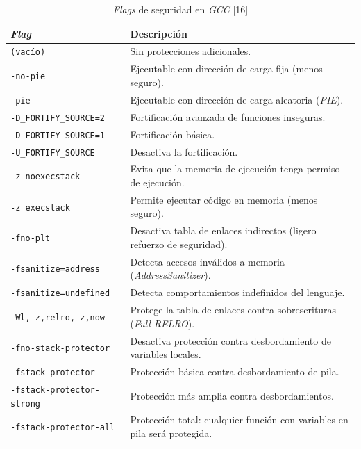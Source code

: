 \begin{table}[H]
\centering
\footnotesize %
\begin{tabularx}{\linewidth}{|l|Y|}
\hline
\textbf{\emph{Flag}} & \textbf{Descripción} \\
\hline
\texttt{(vacío)} & Sin protecciones adicionales. \\
\texttt{-no-pie} & Ejecutable con dirección de carga fija (menos seguro). \\
\texttt{-pie} & Ejecutable con dirección de carga aleatoria (\emph{PIE}). \\
\texttt{-D\_FORTIFY\_SOURCE=2} & Fortificación avanzada de funciones inseguras. \\
\texttt{-D\_FORTIFY\_SOURCE=1} & Fortificación básica. \\
\texttt{-U\_FORTIFY\_SOURCE} & Desactiva la fortificación. \\
\texttt{-z noexecstack} & Evita que la memoria de ejecución tenga permiso de ejecución. \\
\texttt{-z execstack} & Permite ejecutar código en memoria (menos seguro). \\
\texttt{-fno-plt} & Desactiva tabla de enlaces indirectos (ligero refuerzo de seguridad). \\
\texttt{-fsanitize=address} & Detecta accesos inválidos a memoria (\emph{AddressSanitizer}). \\
\texttt{-fsanitize=undefined} & Detecta comportamientos indefinidos del lenguaje. \\
\texttt{-Wl,-z,relro,-z,now} & Protege la tabla de enlaces contra sobrescrituras (\emph{Full RELRO}). \\
\texttt{-fno-stack-protector} & Desactiva protección contra desbordamiento de variables locales. \\
\texttt{-fstack-protector} & Protección básica contra desbordamiento de pila. \\
\texttt{-fstack-protector-strong} & Protección más amplia contra desbordamientos. \\
\texttt{-fstack-protector-all} & Protección total: cualquier función con variables en pila será protegida. \\
\hline
\end{tabularx}
\caption{\emph{Flags} de seguridad en \emph{GCC} [16]}
\label{tab:gcc_seguridad}
\end{table}


